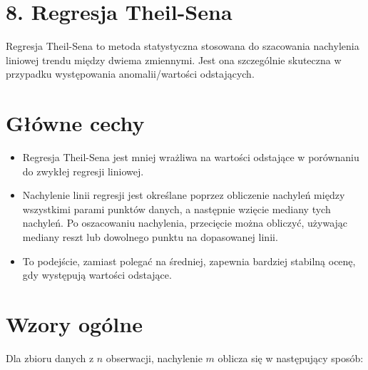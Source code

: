 {}
\justify
\fontsize{14}{16}\selectfont
\setlength{\parindent}{0pt}
\section*{8. Regresja Theil-Sena}
\label{sec:machine_learning_overview}
\fontsize{12}{14}\selectfont
\vspace{-1.0em}

\hspace{1.5cm} Regresja Theil-Sena to metoda statystyczna stosowana do szacowania nachylenia liniowej trendu między dwiema zmiennymi. Jest ona szczególnie skuteczna w przypadku występowania anomalii/wartości odstających.

{}
\section*{Główne cechy  \cite{url_theil_sen_robust_regression, url_theilsen_regression_and_estimator}}
\vspace{-1.0em}
\label{sec:what_is_ml}

\begin{itemize}

\item Regresja Theil-Sena jest mniej wrażliwa na wartości odstające w porównaniu do zwykłej regresji liniowej. 


\item Nachylenie linii regresji jest określane poprzez obliczenie nachyleń między wszystkimi parami punktów danych, a następnie wzięcie mediany tych nachyleń. 
Po oszacowaniu nachylenia, przecięcie można obliczyć, używając mediany reszt lub dowolnego punktu na dopasowanej linii.


\item To podejście, zamiast polegać na średniej, zapewnia bardziej stabilną ocenę, gdy występują wartości odstające.
\end{itemize}


{}
\section*{Wzory ogólne \cite{url_TheilSenRegressor}}
\vspace{-1.0em}
\label{sec:what_is_ml}

Dla zbioru danych z $n$ obserwacji, nachylenie $m$ oblicza się w następujący sposób:

